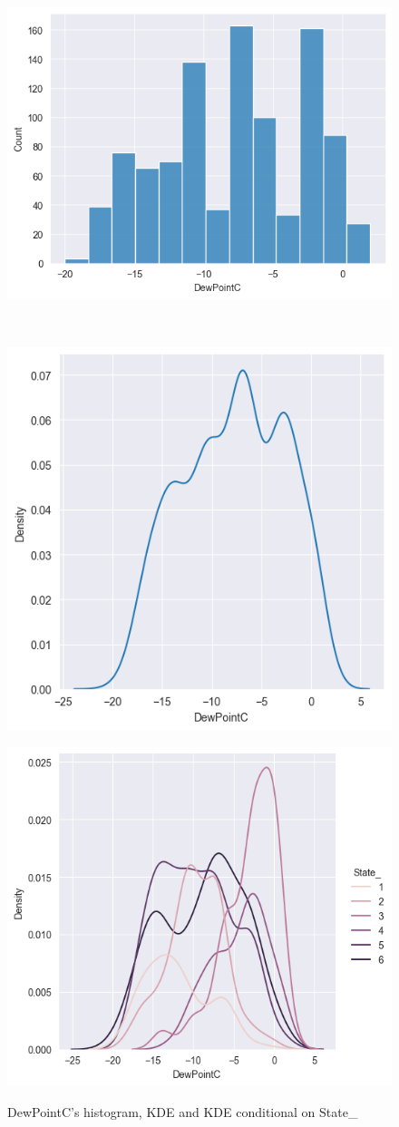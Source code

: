 \documentclass[12pt, bachelor, substylefile = algo_title.rtx]{disser}
\theoremstyle{definition}
\begin{document}
\begin{figure}[!h]
\centering
   \begin{minipage}{0.48\textwidth}
     \includegraphics[width=.7\linewidth]{dewpoint_hist}
	\label{fig: 2a}
   \end{minipage}\\
   \begin{minipage}{0.48\textwidth}
     \centering
     \includegraphics[width=.7\linewidth]{dewpoint_kde}
	\label{fig: 2b}
   \end{minipage}\hfill
\begin{minipage}{0.48\textwidth}
     \includegraphics[width=.7\linewidth]{dewpoint_kde1}
	\label{fig: 2c}
   \end{minipage}
\caption{DewPointC's histogram, KDE and KDE conditional on State\_}
\label{fig: 2}
\end{figure}
\end{document}
